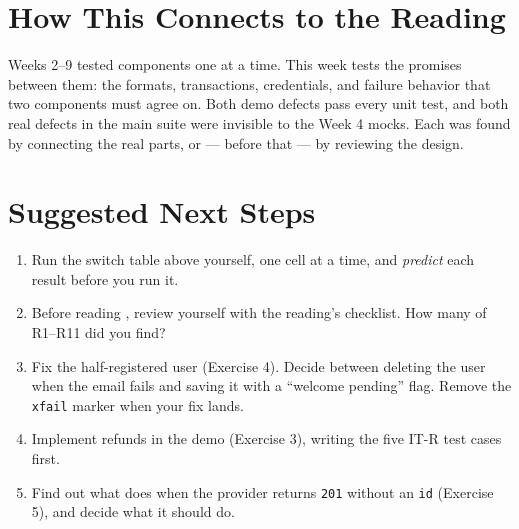 \documentclass[11pt]{article}
\begin{document}
\section{How This Connects to the Reading}
\begin{keyidea}
Weeks 2--9 tested components one at a time. This week tests the
promises between them: the formats, transactions, credentials, and
failure behavior that two components must agree on. Both demo defects
pass every unit test, and both real defects in the main suite were
invisible to the Week 4 mocks. Each was found by connecting the real
parts, or --- before that --- by reviewing the design.
\end{keyidea}

\section{Suggested Next Steps}
\begin{enumerate}
\item Run the switch table above yourself, one cell at a time, and
\emph{predict} each result before you run it.
\item Before reading , review
 yourself with the reading's
checklist. How many of R1--R11 did you find?
\item Fix the half-registered user (Exercise 4). Decide between deleting
the user when the email fails and saving it with a ``welcome pending''
flag. Remove the \texttt{xfail} marker when your fix lands.
\item Implement refunds in the demo (Exercise 3), writing the five
IT-R test cases first.
\item Find out what  does when the provider
returns \texttt{201} without an \texttt{id} (Exercise 5), and decide
what it should do.
\end{enumerate}
\end{document}
